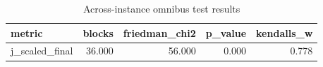 \begin{table}[!t]
\centering
\caption{Across-instance omnibus test results}
\label{tab:friedman_omnibus_generated}
\begin{tabular}{lrrrr}
\toprule
metric & blocks & friedman_chi2 & p_value & kendalls_w \\
\midrule
j_scaled_final & 36.000 & 56.000 & 0.000 & 0.778 \\
\bottomrule
\end{tabular}

\end{table}